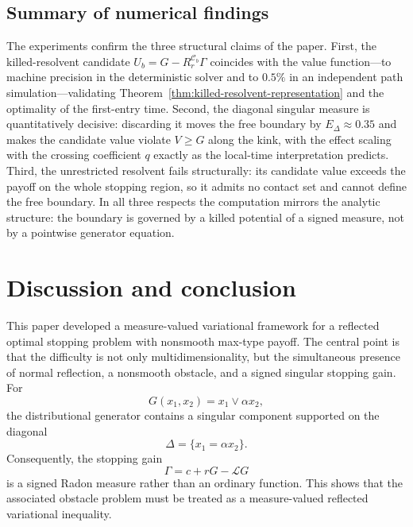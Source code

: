 \documentclass[pdflatex,sn-mathphys-num]{sn-jnl}
\theoremstyle{plain}
\theoremstyle{definition}
\theoremstyle{remark}
\numberwithin{equation}{section}
\begin{document}
\subsection{Summary of numerical findings}
\label{subsec:numerics-summary}

The experiments confirm the three structural claims of the paper. First, the
killed-resolvent candidate $U_b=G-R_r^{\mathcal C_b}\Gamma$ coincides with the
value function---to machine precision in the deterministic solver and to $0.5\%$
in an independent path simulation---validating
Theorem~\ref{thm:killed-resolvent-representation} and the optimality of the
first-entry time. Second, the diagonal singular measure is quantitatively
decisive: discarding it moves the free boundary by $E_\Delta\approx0.35$ and
makes the candidate value violate $V\ge G$ along the kink, with the effect
scaling with the crossing coefficient $q$ exactly as the local-time
interpretation predicts. Third, the unrestricted resolvent fails structurally:
its candidate value exceeds the payoff on the whole stopping region, so it admits
no contact set and cannot define the free boundary. In all three respects the
computation mirrors the analytic structure: the boundary is governed by a killed
potential of a signed measure, not by a pointwise generator equation.

\section{Discussion and conclusion}
\label{sec:discussion-conclusion}

This paper developed a measure-valued variational framework for a reflected
optimal stopping problem with nonsmooth max-type payoff. The central point is
that the difficulty is not only multidimensionality, but the simultaneous
presence of normal reflection, a nonsmooth obstacle, and a signed singular
stopping gain. For
\[
        G(x_1,x_2)=x_1\vee \alpha x_2 ,
\]
the distributional generator contains a singular component supported on the
diagonal
\[
        \Delta=\{x_1=\alpha x_2\}.
\]
Consequently, the stopping gain
\[
        \Gamma=c+rG-\mathcal LG
\]
is a signed Radon measure rather than an ordinary function. This shows that the
associated obstacle problem must be treated as a measure-valued reflected
variational inequality.
\end{document}
